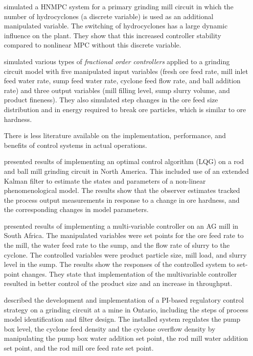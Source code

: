 \cite{botha_hybrid_2018} simulated a \gls{HNMPC} system for a primary grinding mill circuit in which the number of hydrocyclones (a discrete variable) is used as an additional manipulated variable. The switching of hydrocyclones has a large dynamic influence on the plant. They show that this increased controller stability compared to nonlinear \gls{MPC} without this discrete variable.

\cite{aguila-camacho_control_2017} simulated various types of \textit{fractional order controllers} applied to a grinding circuit model with five manipulated input variables (fresh ore feed rate, mill inlet feed water rate, sump feed water rate, cyclone feed flow rate, and ball addition rate) and three output variables (mill filling level, sump slurry volume, and product fineness). They also simulated step changes in the ore feed size distribution and in energy required to break ore particles, which is similar to ore hardness.

There is less literature available on the implementation, performance, and benefits of control systems in actual operations.

\cite{herbst_optimal_1988} presented results of implementing an optimal control algorithm (\gls{LQG}) on a rod and ball mill grinding circuit in North America. This included use of an extended Kalman filter to estimate the states and parameters of a non-linear phenomenological model. The results show that the observer estimates tracked the process output measurements in response to a change in ore hardness, and the corresponding changes in model parameters.

\cite{hulbert_multivariable_1990} presented results of implementing a multi-variable controller on an AG mill in South Africa. The manipulated variables were set points for the ore feed rate to the mill, the water feed rate to the sump, and the flow rate of slurry to the cyclone. The controlled variables were product particle size, mill load, and slurry level in the sump. The results show the responses of the controlled system to set-point changes. They state that implementation of the multivariable controller resulted in better control of the product size and an increase in throughput.

\cite{desbiens_distributed_1997} described the development and implementation of a \gls{PI}-based regulatory control strategy on a grinding circuit at a mine in Ontario, including the steps of process model identification and filter design. The installed system regulates the pump box level, the cyclone feed density and the cyclone overflow density by manipulating the pump box water addition set point, the rod mill water addition set point, and the rod mill ore feed rate set point.

